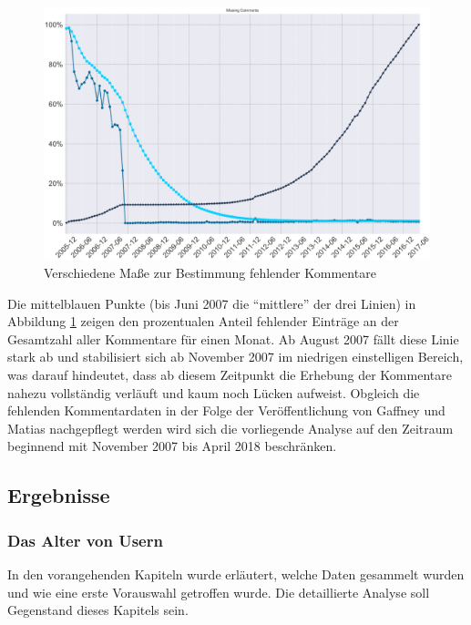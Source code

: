 \documentclass[11pt,a4paper,twoside]{article}
\begin{document}
\begin{figure}

{\centering \includegraphics[width=0.8\linewidth]{./images/gaffneymatias_fig4} 

}

\caption{Verschiedene Maße zur Bestimmung fehlender Kommentare
\autocite{Gaffney2018}}\label{fig:gf4}
\end{figure}

Die mittelblauen Punkte (bis Juni 2007 die \enquote{mittlere} der drei
Linien) in Abbildung \ref{fig:gf4} zeigen den prozentualen Anteil
fehlender Einträge an der Gesamtzahl aller Kommentare für einen Monat.
Ab August 2007 fällt diese Linie stark ab und stabilisiert sich ab
November 2007 im niedrigen einstelligen Bereich, was darauf hindeutet,
dass ab diesem Zeitpunkt die Erhebung der Kommentare nahezu vollständig
verläuft und kaum noch Lücken aufweist. Obgleich die fehlenden
Kommentardaten in der Folge der Veröffentlichung von Gaffney und Matias
nachgepflegt werden \autocite{Baumgartner2018} wird sich die vorliegende
Analyse auf den Zeitraum beginnend mit November 2007 bis April 2018
beschränken.

\hypertarget{ergebnisse}{%
\subsection{Ergebnisse}\label{ergebnisse}}

\hypertarget{das-alter-von-usern}{%
\subsubsection{Das Alter von Usern}\label{das-alter-von-usern}}

In den vorangehenden Kapiteln wurde erläutert, welche Daten gesammelt
wurden und wie eine erste Vorauswahl getroffen wurde. Die detaillierte
Analyse soll Gegenstand dieses Kapitels sein.
\end{document}

